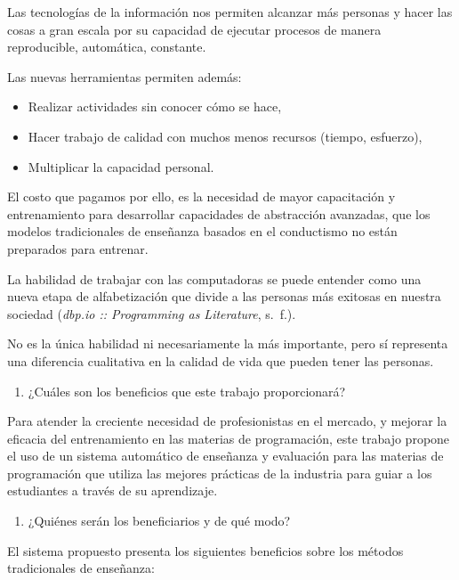 \documentclass[
  12,
]{scrartcl}
\providecommand{\tightlist}{%
  \setlength{\itemsep}{0pt}\setlength{\parskip}{0pt}}
\begin{document}
Las tecnologías de la información nos permiten alcanzar más personas y
hacer las cosas a gran escala por su capacidad de ejecutar procesos de
manera reproducible, automática, constante.

Las nuevas herramientas permiten además:

\begin{itemize}
\tightlist
\item
  Realizar actividades sin conocer cómo se hace,
\item
  Hacer trabajo de calidad con muchos menos recursos (tiempo, esfuerzo),
\item
  Multiplicar la capacidad personal.
\end{itemize}

El costo que pagamos por ello, es la necesidad de mayor capacitación y
entrenamiento para desarrollar capacidades de abstracción avanzadas, que
los modelos tradicionales de enseñanza basados en el conductismo no
están preparados para entrenar.

La habilidad de trabajar con las computadoras se puede entender como una
nueva etapa de alfabetización que divide a las personas más exitosas en
nuestra sociedad (\emph{dbp.io :: Programming as Literature}, s.~f.).

No es la única habilidad ni necesariamente la más importante, pero sí
representa una diferencia cualitativa en la calidad de vida que pueden
tener las personas.

\begin{enumerate}
\def\labelenumi{\arabic{enumi}.}
\tightlist
\item
  ¿Cuáles son los beneficios que este trabajo proporcionará?
\end{enumerate}

Para atender la creciente necesidad de profesionistas en el mercado, y
mejorar la eficacia del entrenamiento en las materias de programación,
este trabajo propone el uso de un sistema automático de enseñanza y
evaluación para las materias de programación que utiliza las mejores
prácticas de la industria para guiar a los estudiantes a través de su
aprendizaje.

\begin{enumerate}
\def\labelenumi{\arabic{enumi}.}
\setcounter{enumi}{1}
\tightlist
\item
  ¿Quiénes serán los beneficiarios y de qué modo?
\end{enumerate}

El sistema propuesto presenta los siguientes beneficios sobre los
métodos tradicionales de enseñanza:
\end{document}
